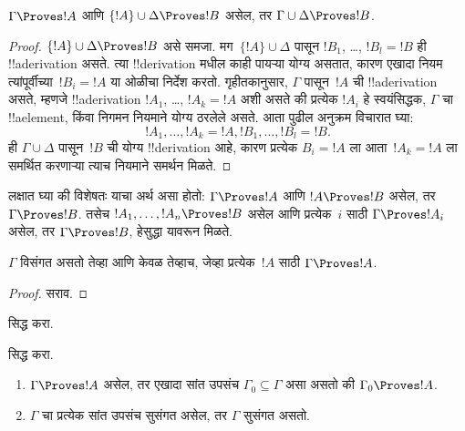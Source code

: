 \documentclass[../../../include/open-logic-section]{subfiles}
\begin{document}
\begin{prop}[संक्रमकता]
$\Gamma \Proves !A$ आणि $\{!A\} \cup \Delta \Proves
!B$ असेल, तर $\Gamma \cup \Delta \Proves !B$.
\end{prop}

\begin{proof}
  $\{!A\} \cup \Delta \Proves !B$ असे समजा. मग~$\{!A\} \cup
  \Delta$ पासून $!B_1$, \dots, $!B_l = !B$ ही !!a{derivation} असते.
  त्या !!{derivation} मधील काही पायऱ्या योग्य असतात, कारण एखादा नियम
  त्यांपूर्वीच्या~$!B_i = !A$ या ओळीचा निर्देश करतो. गृहीतकानुसार,
  $\Gamma$ पासून~$!A$ ची !!a{derivation} असते, म्हणजे !!a{derivation}
  $!A_1$, \dots, $!A_k = !A$ अशी असते की प्रत्येक $!A_i$ हे स्वयंसिद्धक,
  $\Gamma$ चा !!a{element}, किंवा निगमन नियमाने योग्य ठरलेले असते. आता
  पुढील अनुक्रम विचारात घ्या:
  \[
  !A_1, \dots, !A_k = !A, !B_1, \dots, !B_l = !B.
  \]
  ही $\Gamma \cup \Delta$ पासून~$!B$ ची योग्य !!{derivation} आहे, कारण
  प्रत्येक $B_i = !A$ ला आता~$!A_k = !A$ ला समर्थित करणाऱ्या त्याच नियमाने
  समर्थन मिळते.
\end{proof}

लक्षात घ्या की विशेषतः याचा अर्थ असा होतो: $\Gamma \Proves !A$ आणि $!A
\Proves !B$ असेल, तर $\Gamma \Proves !B$. तसेच $!A_1,
\dots, !A_n \Proves !B$ असेल आणि प्रत्येक~$i$ साठी $\Gamma \Proves !A_i$
असेल, तर $\Gamma \Proves !B$, हेसुद्धा यावरून मिळते.

\begin{prop}
$\Gamma$ विसंगत असतो तेव्हा आणि केवळ तेव्हाच, जेव्हा प्रत्येक~$!A$ साठी
$\Gamma \Proves !A$.
\end{prop}

\begin{proof}
सराव.
\end{proof}

\begin{prob}
 सिद्ध करा.
\end{prob}
\tagendprob

\begin{prob}
 सिद्ध करा.
\end{prob}
\tagendprob

\begin{prop}[संहतता]
  \begin{enumerate}
  \item $\Gamma \Proves !A$ असेल, तर एखादा सांत उपसंच $\Gamma_0
    \subseteq \Gamma$ असा असतो की $\Gamma_0 \Proves !A$.
  \item $\Gamma$ चा प्रत्येक सांत उपसंच सुसंगत असेल, तर $\Gamma$ सुसंगत
    असतो.
  \end{enumerate}
\end{prop}
\end{document}
